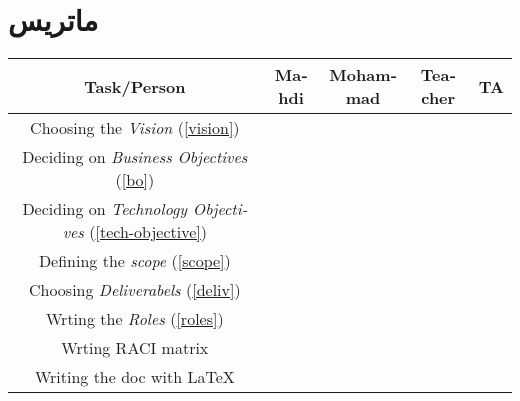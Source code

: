 \chapter{ماتریس }
\begin{table}[H]
\begin{latin}
\begin{adjustbox}{width=\textwidth}
\begin{tabular}{|c|c|c|c|c|}
\hline
Task/Person & Mahdi & Mohammad & Teacher & TA \\
\hline
\hline

Choosing the \textit{Vision} (\ref{vision}) &&&& \\
\hline

Deciding on \textit{Business Objectives} (\ref{bo}) &&&& \\
\hline

Deciding on \textit{Technology Objectives} (\ref{tech-objective}) &&&& \\
\hline

Defining the \textit{scope} (\ref{scope}) &&&& \\
\hline

Choosing \textit{Deliverabels} (\ref{deliv}) &&&& \\
\hline

Wrting the \textit{Roles} (\ref{roles}) &&&& \\
\hline


Wrting RACI matrix &&&& \\
\hline
Writing the doc with \LaTeX &&&& \\
\hline
\end{tabular}
\end{adjustbox}
\end{latin}
\end{table}
